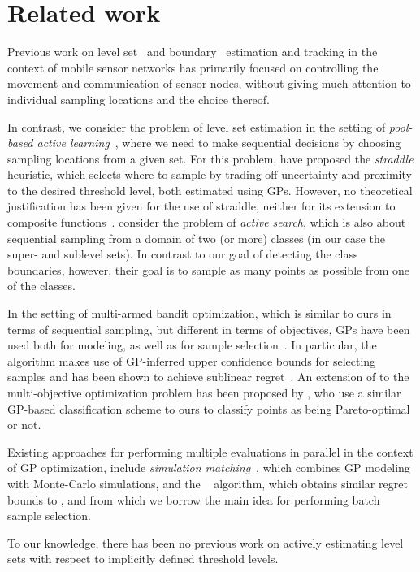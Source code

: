 \section{Related work}
Previous work on level set~\cite{dantu07,srinivasan08} and
boundary~\cite{singh06} estimation and tracking in the context of mobile
sensor networks has primarily focused on controlling the movement and
communication of sensor nodes, without giving much attention to
individual sampling locations and the choice thereof.

In contrast, we consider the problem of level set estimation in the setting of
\emph{pool-based active learning}~\cite{settles09}, where we need to make
sequential decisions by choosing sampling locations from a given set.
For this problem, \citet{bryan05} have proposed the
\emph{straddle} heuristic, which selects where to sample by trading off
uncertainty and proximity to the desired threshold level, both estimated
using GPs.
However, no theoretical justification has been given for the use of straddle,
neither for its extension to composite functions~\cite{bryan08}.
\citet{garnett12} consider the problem of
\emph{active search}, which is also about sequential sampling from a domain of
two (or more) classes (in our case the super- and sublevel sets).
In contrast to our goal of detecting the class boundaries, however,
their goal is to sample as many points as possible from one of the classes.

In the setting of multi-armed bandit optimization, which is similar to ours
in terms of sequential sampling, but different in terms of objectives,
GPs have been used both for modeling, as well as for sample
selection~\mbox{\cite{brochu10}}. In particular, the \gpucb algorithm
makes use of GP-inferred upper confidence bounds for selecting samples and
has been shown to achieve sublinear regret~\cite{srinivas10}.
An extension of \gpucb to the multi-objective
optimization problem has been proposed by
\citet{zuluaga13}, who use a similar GP-based
classification scheme to ours to classify points as being Pareto-optimal
or not.

Existing approaches for performing multiple evaluations in
parallel in the context of GP optimization, include
\emph{simulation matching}~\cite{azimi10}, which combines GP modeling with
Monte-Carlo simulations, and the \gpbucb~\cite{desautels12} algorithm,
which obtains similar regret bounds to \gpucb, and from which we borrow
the main idea for performing batch sample selection.

To our knowledge, there has been no previous work on actively estimating
level sets with respect to implicitly defined threshold levels.

